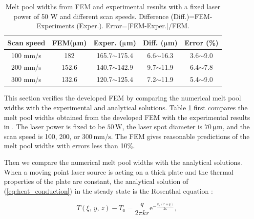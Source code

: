 \documentclass [11pt, proquest] {uwthesis}[2020/02/24]
\begin{document}
\begin{table}[!ht]
\caption{\label{tab:Model-verification:-comparing}Melt pool widths from FEM
and experimental results with a fixed
laser power of 50 W and different scan speeds. Difference (Diff.)=FEM-Experiments
(Exper.). Error=|FEM-Exper.|/FEM.}

\centering{}\renewcommand{\arraystretch}{1}\begingroup\tabcolsep=1pt%
\begin{tabular*}{10cm}{@{\extracolsep{\fill}}ccccc}
\hline 
Scan speed & FEM($\muup$m) & Exper. ($\muup$m) & Diff. ($\muup$m) & Error (\%)\tabularnewline
\hline 
100 mm/s & 182 & 165.7$\sim$175.4 & 6.6$\sim$16.3 & 3.6$\sim$9.0\tabularnewline
200 mm/s & 152.6 & 140.7$\sim$142.9 & 9.7$\sim$11.9 & 6.4$\sim$7.8\tabularnewline
300 mm/s & 132.6 & 120.7$\sim$125.4 & 7.2$\sim$11.9 & 5.4$\sim$9.0\tabularnewline
\hline 
\end{tabular*}\endgroup
\end{table}
This section verifies the developed FEM by comparing the numerical
melt pool widths with the experimental and analytical solutions.
Table \ref{tab:Model-verification:-comparing} first compares the
melt pool widths obtained from the developed FEM with the experimental
results in \cite{yadroitsev2014selective}. The laser power is fixed
to be $50\,\text{W}$, the laser spot diameter is $70\,$$\muup$m,
and the scan speed is 100, 200, or $300\,\text{mm/s}$. The FEM gives
reasonable predictions of the melt pool widths with errors less than
10\%.

Then we compare the numerical melt pool widths with the analytical
solutions. When a moving point laser source is acting on a thick plate
and the thermal properties of the plate are constant, the analytical
solution of (\ref{eq:heat_conduction}) in the steady state is the
Rosenthal equation \cite{kannatey2009principles}:

\noindent 
\begin{equation}
T(\xi,\,y,\,z)-T_{0}=\frac{q}{2\pi kr}\text{e}^{-\frac{u_{x}(r+\xi)}{2\kappa}},\label{eq:Rosenthal}
\end{equation}
\end{document}
